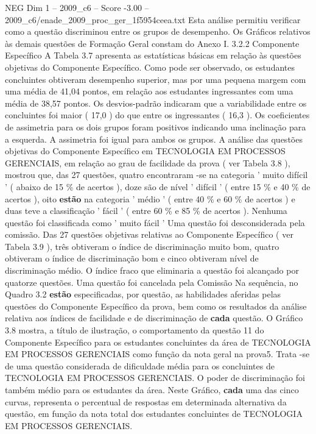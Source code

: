 \begin{textsample}{NEG Dim 1 – 2009\_c6 – Score -3.00 – 2009\_c6/enade\_2009\_proc\_ger\_1f5954ceea.txt}
Esta análise permitiu verificar como a questão discriminou entre os grupos de desempenho.
Os Gráficos relativos às demais questões de Formação Geral constam do Anexo I. 3.2.2 Componente Específico A Tabela 3.7 apresenta as estatísticas básicas em relação às questões objetivas do Componente Específico.
Como pode ser observado, os estudantes concluintes obtiveram desempenho superior, mas por uma pequena margem com uma média de 41,04 pontos, em relação aos estudantes ingressantes com uma média de 38,57 pontos.
Os desvios-padrão indicaram que a variabilidade entre os concluintes foi maior ( 17,0 ) do que entre os ingressantes ( 16,3 ).
Os coeficientes de assimetria para os dois grupos foram positivos indicando uma inclinação para a esquerda.
A assimetria foi igual para ambos os grupos.
A análise das questões objetivas do Componente Específico em TECNOLOGIA EM PROCESSOS GERENCIAIS, em relação ao grau de facilidade da prova ( ver Tabela 3.8 ), mostrou que, das 27 questões, quatro encontraram -se na categoria ' muito difícil ' ( abaixo de 15 \% de acertos ), doze são de nível ' difícil ' ( entre 15 \% e 40 \% de acertos ), oito \textbf{estão} na categoria ' médio ' ( entre 40 \% e 60 \% de acertos ) e duas teve a classificação ' fácil ' ( entre 60 \% e 85 \% de acertos ).
Nenhuma questão foi classificada como ' muito fácil ' Uma questão foi desconsiderada pela comissão.
Das 27 questões objetivas relativas ao Componente Específico ( ver Tabela 3.9 ), três obtiveram o índice de discriminação muito bom, quatro obtiveram o índice de discriminação bom e cinco obtiveram nível de discriminação médio.
O índice fraco que eliminaria a questão foi alcançado por quatorze questões.
Uma questão foi cancelada pela Comissão Na sequência, no Quadro 3.2 \textbf{estão} especificadas, por questão, as habilidades aferidas pelas questões do Componente Específico da prova, bem como os resultados da análise relativa aos índices de facilidade e de discriminação de \textbf{cada} questão.
O Gráfico 3.8 mostra, a título de ilustração, o comportamento da questão 11 do Componente Específico para os estudantes concluintes da área de TECNOLOGIA EM PROCESSOS GERENCIAIS como função da nota geral na prova5.
Trata -se de uma questão considerada de dificuldade média para os concluintes de TECNOLOGIA EM PROCESSOS GERENCIAIS.
O poder de discriminação foi também médio para os estudantes da área.
Neste Gráfico, \textbf{cada} uma das cinco curvas, representa o percentual de respostas em determinada alternativa da questão, em função da nota total dos estudantes concluintes de TECNOLOGIA EM PROCESSOS GERENCIAIS.

\end{textsample}
